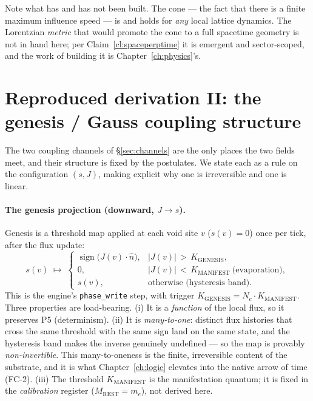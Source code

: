 Note what has and has not been built. The cone --- the fact that there is a finite
maximum influence speed --- is  and holds for \emph{any} local lattice
dynamics. The Lorentzian \emph{metric} that would promote the cone to a full
spacetime geometry is not in hand here; per Claim~\ref{cl:spaceperptime} it is
emergent and sector-scoped, and the work of building it is Chapter~\ref{ch:physics}'s.

\section{Reproduced derivation II: the genesis / Gauss coupling structure}\label{sec:couplingderiv}

The two coupling channels of \S\ref{sec:channels} are the only places the two
fields meet, and their structure is fixed by the postulates. We state each as a
rule on the configuration $(s,J)$, making explicit why one is irreversible and one
is linear.

\paragraph{The genesis projection (downward, $J\to s$).} Genesis is a threshold
map applied at each void site $v$ ($s(v)=0$) once per tick, after the flux update:
\[
  s(v) \;\longmapsto\;
  \begin{cases}
    \operatorname{sign}\!\bigl(J(v)\cdot \hat n\bigr), &
      \lvert J(v)\rvert \,>\, K_{\mathrm{GENESIS}},\\[4pt]
    0, & \lvert J(v)\rvert \,<\, K_{\mathrm{MANIFEST}}\ \text{(evaporation)},\\[4pt]
    s(v), & \text{otherwise (hysteresis band).}
  \end{cases}
\]
This is the engine's \texttt{phase\_write} step, with trigger
$K_{\mathrm{GENESIS}} = N_c\cdot K_{\mathrm{MANIFEST}}$. Three properties are
load-bearing. (i) It is a \emph{function} of the local flux, so it preserves P5
(determinism). (ii) It is \emph{many-to-one}: distinct flux histories that cross
the same threshold with the same sign land on the same state, and the hysteresis
band makes the inverse genuinely undefined --- so the map is provably
\emph{non-invertible}. This many-to-oneness is the finite, irreversible content of
the substrate, and it is what Chapter~\ref{ch:logic} elevates into the native arrow
of time (FC-2). (iii) The threshold $K_{\mathrm{MANIFEST}}$ is the manifestation
quantum; it is fixed in the \emph{calibration} register
($M_{\mathrm{REST}}=m_e$), not derived here.

